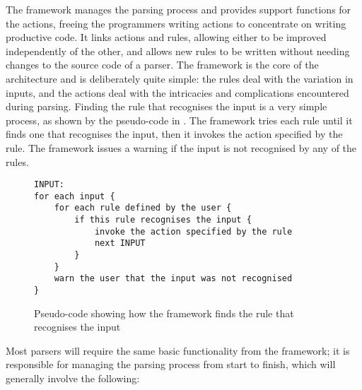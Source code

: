 \label{framework in architecture}

The framework manages the parsing process and provides support functions
for the actions, freeing the programmers writing actions to concentrate on
writing productive code.  It links actions and rules, allowing either to be
improved independently of the other, and allows new rules to be written
without needing changes to the source code of a parser.  The framework is
the core of the architecture and is deliberately quite simple: the rules
deal with the variation in inputs, and the actions deal with the
intricacies and complications encountered during parsing.  Finding the rule
that recognises the input is a very simple process, as shown by the
pseudo-code in .  The framework tries each rule until it finds one that
recognises the input, then it invokes the action specified by the rule.
The framework issues a warning if the input is not recognised by any of the
rules.

\begin{figure}[thbp]
    \caption{Pseudo-code showing how the framework finds the rule that
    recognises the input}
    \empty{}\label{Pseudo-code describing how inputs are recognised}
\begin{verbatim}
INPUT:
for each input {
    for each rule defined by the user {
        if this rule recognises the input {
            invoke the action specified by the rule
            next INPUT
        }
    }
    warn the user that the input was not recognised
}
\end{verbatim}
\end{figure}

Most parsers will require the same basic functionality from the framework;
it is responsible for managing the parsing process from start to finish,
which will generally involve the following:

